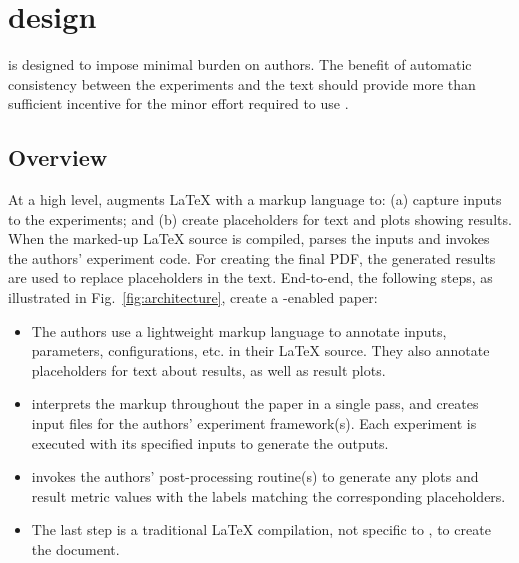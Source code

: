 \section{\sysname design}
\label{sec:system-design}

\sysname is designed to impose minimal burden on authors. The benefit of automatic consistency between the experiments and the text should provide more than sufficient incentive for the minor effort required to use \sysname.


\subsection{Overview}
\label{sec:workflow}

At a high level, \sysname augments \LaTeX{} with a markup language to: (a) capture inputs to the experiments; and (b) create placeholders for text and plots showing results. When the marked-up \LaTeX{} source is compiled, \sysname parses the inputs and invokes the authors' experiment code. For creating the final PDF, the generated results are used to replace placeholders in the text.
End-to-end, the following steps, as illustrated in Fig.~\ref{fig:architecture}, create a \sysname-enabled paper:


\begin{itemize}[leftmargin=12pt,itemsep=2pt,topsep=2pt]
    \item The authors use a lightweight markup language to annotate inputs, parameters, configurations, etc. in their \LaTeX{} source. They also annotate placeholders for text about results, as well as result plots.
    \item \sysname interprets the markup throughout the paper in a single pass, and creates input files for the authors' experiment framework(s). Each experiment is executed with its specified inputs to generate the outputs.
    \item \sysname invokes the authors' post-processing routine(s) to generate any plots and result metric values with the labels matching the corresponding placeholders.
    \item The last step is a traditional \LaTeX{} compilation, not specific to \sysname, to create the document.
\end{itemize}

